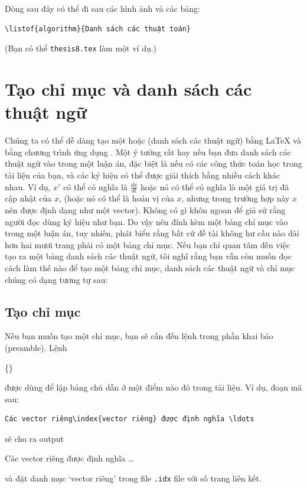 \documentclass[a4paper]{report}
\begin{document}
\noindent Dòng sau đây có thể đi sau các hình ảnh và các bảng:
\begin{verbatim}
\listof{algorithm}{Danh sách các thuật toán}
\end{verbatim}
(Bạn có thể  \texttt{thesis8.tex} làm một ví dụ.)


\chapter{Tạo chỉ mục và danh sách các thuật ngữ}

Chúng ta có thể dễ dàng tạo một  hoặc  (danh sách các thuật ngữ) bằng \LaTeX{} và bằng chương trình ứng dụng . Một ý tưởng rất hay nếu bạn đưa danh sách các thuật ngữ vào trong một luận án, đặc biệt là nếu có các công thức toán học trong tài liệu của bạn, và  các ký hiệu có thể được giải thích bằng nhiều cách khác nhau.
Ví dụ, $x'$ có thể có nghĩa là $\frac{dx}{dt}$ hoặc nó có thể có nghĩa là một giá trị đã cập nhật của $x$, (hoặc nó có thể là  hoán vị của $x$, nhưng trong trường hợp này $x$ nên được định dạng như một vector). Không có gì khôn ngoan để giả sử rằng người đọc dùng ký hiệu như bạn. Do vậy nên đính kèm một bảng chỉ mục vào trong một luận án, tuy nhiên, \latexbook{} phát biểu rằng bất cứ đề tài không hư cấu nào dài hơn hai mươi trang phải có một bảng chỉ mục.
Nếu bạn chỉ quan tâm đến việc tạo ra một bảng danh sách các thuật ngữ, tôi nghĩ rằng bạn vẫn còn muốn đọc cách làm thế nào để tạo một bảng chỉ mục, danh sách các thuật ngữ và chỉ mục chúng có dạng tương tự sau:


\section{Tạo chỉ mục}

Nếu bạn muốn tạo một chỉ mục, bạn sẽ cần đến lệnh  trong phần khai báo (preamble).
Lệnh
\begin{definition}
\{\}
\end{definition}%
được dùng để lập bảng chú dẫn   ở một điểm nào đó trong tài liệu. Ví dụ, đoạn mã sau:
\begin{code}
\begin{verbatim}
Các vector riêng\index{vector riêng} được định nghĩa \ldots
\end{verbatim}
\end{code}%
sẽ cho ra output
\begin{result}
Các vector riêng được định nghĩa \ldots
\end{result}%
và đặt danh mục `vector riêng'  trong file \texttt{.idx} file  với số trang liên kết.\\[2.0ex]
\end{document}
